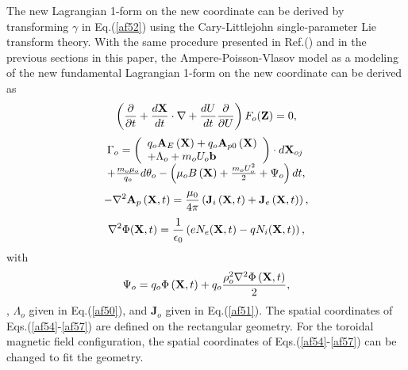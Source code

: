 \documentclass[12pt]{iopart}
\begin{document}
The new Lagrangian 1-form on the new coordinate can be derived by transforming $\gamma$ in Eq.(\ref{af52}) using the Cary-Littlejohn single-parameter Lie transform theory. With the same procedure presented in Ref.(\cite{2017shuangxi}) and in the previous sections in this paper, the Ampere-Poisson-Vlasov model as a modeling of the new fundamental Lagrangian 1-form on the new coordinate can be derived as
\begin{equation}\label{af54}
\left( {\frac{\partial }{{\partial t}} + \frac{{d{\bf{X}}}}{{dt}}\cdot\nabla  + \frac{{dU}}{{dt}}\frac{\partial }{{\partial U}}} \right){F_o}({\bf{Z}}) = 0,
\end{equation}
\begin{equation}\label{af55}
\begin{array}{*{20}{l}}
{{\Gamma _o} = \left( {\begin{array}{*{20}{l}}
{{q_o}{{\bf{A}}_E}\left( {\bf{X}} \right) + {q_o}{{\bf{A}}_{p0}}\left( {\bf{X}} \right)}\\
{ + {\Lambda _o} + {m_o}{U_o}{\bf{b}}}
\end{array}} \right)\cdot d{{\bf{X}}_{oj}}}\\
{ + \frac{{{m_o}{\mu _o}}}{{{q_o}}}d{\theta _o} - \left( {{\mu _o}B\left( {\bf{X}} \right) + \frac{{{m_o}U_o^2}}{2} + {\Psi _o}} \right)dt,}
\end{array}
\end{equation}
\begin{equation}\label{af56}
- {\nabla ^2}{{\bf{A}}_p}\left( {{\bf{X}},t} \right) = \frac{{{\mu _0}}}{{4\pi }}\left( {{{\bf{J}}_i}\left( {{\bf{X}},t} \right) + {{\bf{J}}_e}\left( {{\bf{X}},t} \right)} \right),
\end{equation}
\begin{equation}\label{af57}
{\nabla ^2}\Phi ({\bf{X}},t) = \frac{1}{{{\epsilon_0}}}\left( {e{N_e}({\bf{X}},t) - q{N_i}({\bf{X}},t)} \right),
\end{equation}
with
\begin{equation}\label{af58}
{\Psi _o} = {q_o}\Phi \left( {{\bf{X}},t} \right) + {q_o}\frac{{\rho _o^2{\nabla ^2}\Phi \left( {{\bf{X}},t} \right)}}{2},
\end{equation}
, $\Lambda_o$ given in Eq.(\ref{af50}), and $\mathbf{J}_o$ given in Eq.(\ref{af51}).
The spatial coordinates of Eqs.(\ref{af54}-\ref{af57}) are defined on the rectangular geometry. For the toroidal magnetic field configuration, the spatial coordinates of Eqs.(\ref{af54}-\ref{af57}) can be changed to fit the geometry.
\end{document}
